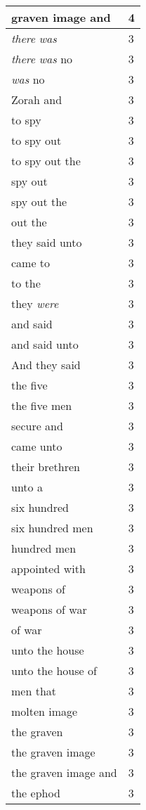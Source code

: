 \begin{center}
\begin{longtable}{|p{3.0in}|p{0.5in}|}
graven image and & 4\\ \hline 
\emph{there} \emph{was} & 3\\ \hline 
\emph{there} \emph{was} no & 3\\ \hline 
\emph{was} no & 3\\ \hline 
Zorah and & 3\\ \hline 
to spy & 3\\ \hline 
to spy out & 3\\ \hline 
to spy out the & 3\\ \hline 
spy out & 3\\ \hline 
spy out the & 3\\ \hline 
out the & 3\\ \hline 
they said unto & 3\\ \hline 
came to & 3\\ \hline 
to the & 3\\ \hline 
they \emph{were} & 3\\ \hline 
and said & 3\\ \hline 
and said unto & 3\\ \hline 
And they said & 3\\ \hline 
the five & 3\\ \hline 
the five men & 3\\ \hline 
secure and & 3\\ \hline 
came unto & 3\\ \hline 
their brethren & 3\\ \hline 
unto a & 3\\ \hline 
six hundred & 3\\ \hline 
six hundred men & 3\\ \hline 
hundred men & 3\\ \hline 
appointed with & 3\\ \hline 
weapons of & 3\\ \hline 
weapons of war & 3\\ \hline 
of war & 3\\ \hline 
unto the house & 3\\ \hline 
unto the house of & 3\\ \hline 
men that & 3\\ \hline 
molten image & 3\\ \hline 
the graven & 3\\ \hline 
the graven image & 3\\ \hline 
the graven image and & 3\\ \hline 
the ephod & 3\\ \hline 

\end{longtable}
\end{center}

